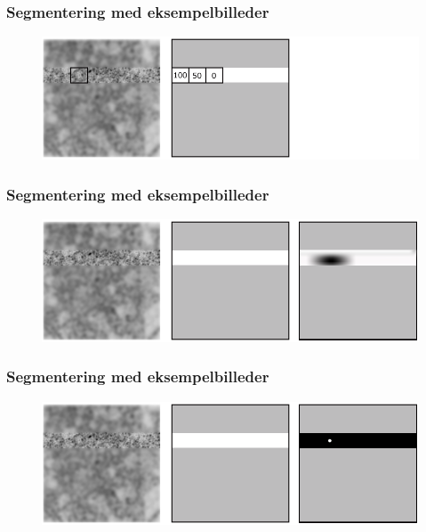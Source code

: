 \documentclass[12pt,t]{beamer}
\begin{document}
\begin{frame}
\frametitle{Segmentering med eksempelbilleder}
\begin{figure}[H]
\includegraphics[scale=0.35]{img/afstand/14.png}
\end{figure}
\end{frame}


\begin{frame}
\frametitle{Segmentering med eksempelbilleder}
\begin{figure}[H]
\includegraphics[scale=0.35]{img/afstand/15.png}
\end{figure}
\end{frame}

\begin{frame}
\frametitle{Segmentering med eksempelbilleder}
\begin{figure}[H]
\includegraphics[scale=0.35]{img/afstand/16.png}
\end{figure}
\end{frame}



%

\end{document}
